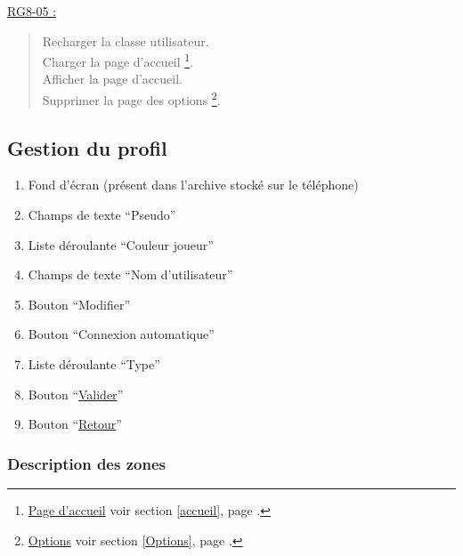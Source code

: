 \documentclass{report}
\begin{document}
				
			\underline{RG8-05 :}
				\begin{quote}
					Recharger la classe utilisateur.\\
					Charger la page d'accueil%
						\footnote[3]{
							\hyperlink{Page d'accueil}{Page d'accueil}
							\og voir section \ref{accueil}, page \pageref{accueil}.\fg
						}.\\
					Afficher la page d'accueil\footnotemark[3].\\
					Supprimer la page des options%
						\footnote[2]{
							\hyperlink{Options}{Options}
							\og voir section \ref{Options}, page \pageref{Options}.\fg
						}.\\		
				\end{quote}
\newpage

	\subsection{Gestion du profil}
	
		\hypertarget{Gestion du profil}{}
		\label{Gestion du profil}
		
		\begin{center}
			
		\end{center}
				
		\begin{enumerate}
		  \item Fond d'écran (présent dans l'archive stocké sur le téléphone)
		  \item Champs de texte ``Pseudo''
		  \item Liste déroulante ``Couleur joueur''
		  \item Champs de texte ``Nom d'utilisateur''
		  \item Bouton ``Modifier''
		  \item Bouton ``Connexion automatique''
		  \item Liste déroulante ``Type''
		  \item Bouton ``\hyperlink{Options}{Valider}''
		  \item Bouton ``\hyperlink{Options}{Retour}''
		\end{enumerate}

		\subsubsection{Description des zones}
		
\end{document}
